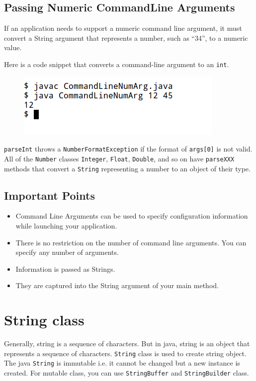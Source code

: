 \documentclass[11pt,a4paper]{article}
\begin{document}
\subsection*{Passing Numeric CommandLine Arguments}
If an application needs to support a numeric command line argument, it must convert a String argument that represents a number, such as ``34'', to a numeric value. 

Here is a code snippet that converts a command-line argument to an \lstinline!int!.


\begin{figure}[H]
 \begin{center}
   \includegraphics[scale=0.5]{CommandLineNumArg.png}
 \end{center}
 \end{figure}

\texttt{parseInt} throws a \texttt{NumberFormatException} if the format of \texttt{args[0]} is not valid. All of the \texttt{Number} classes \texttt{Integer}, \texttt{Float}, \texttt{Double}, and so on have \texttt{parseXXX} methods that convert a \texttt{String} representing a number to an object of their type.

\subsection*{Important Points}
\begin{itemize}
\item Command Line Arguments can be used to specify configuration information while launching your application.
\item There is no restriction on the number of command line arguments. You can specify any number of arguments.
\item Information is passed as Strings.
\item They are captured into the String argument of your main method.
\end{itemize}
\section*{String class}
Generally, string is a sequence of characters. But in java, string is an object that represents a sequence of characters. \texttt{String} class is used to create string object. The java \texttt{String} is immutable i.e. it cannot be changed but a new instance is created. For mutable class, you can use \texttt{StringBuffer} and \texttt{StringBuilder} class.
\end{document}
